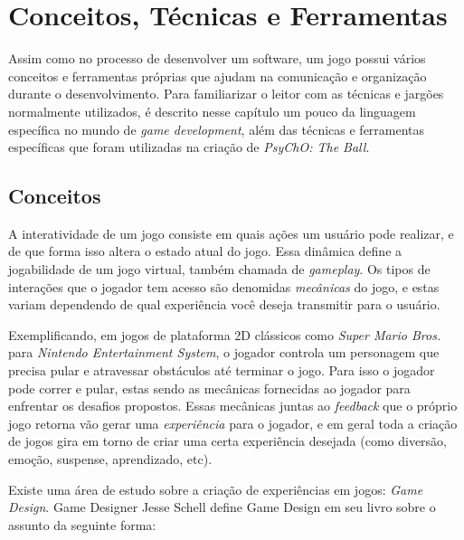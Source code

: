 
\chapter{Conceitos, Técnicas e Ferramentas}
\label{cap:conceitos_tecnicas_e_ferramentas}

Assim como no processo de desenvolver um software, um jogo possui vários conceitos e ferramentas próprias que ajudam na comunicação e organização durante o desenvolvimento.
Para familiarizar o leitor com as técnicas e jargões normalmente utilizados, é descrito nesse capítulo um pouco da linguagem específica no mundo de \textit{game development}, além das técnicas e ferramentas específicas que foram utilizadas na criação de \textit{PsyChO: The Ball}.

\section{Conceitos}
\label{sec:conceitos}
A interatividade de um jogo consiste em quais ações um usuário pode realizar, e de que forma isso altera o estado atual do jogo. Essa dinâmica define a jogabilidade de um jogo virtual, também chamada de \textit{gameplay}. Os tipos de interações que o jogador tem acesso são denomidas \textit{mecânicas} do jogo, e estas variam dependendo de qual experiência você deseja transmitir para o usuário.

Exemplificando, em jogos de plataforma 2D clássicos como \textit{Super Mario Bros.} para \textit{Nintendo Entertainment System}\cite{mario}, o jogador controla um personagem que precisa pular e atravessar obstáculos até terminar o jogo. Para isso o jogador pode correr e pular, estas sendo as mecânicas fornecidas ao jogador para enfrentar os desafios propostos. Essas mecânicas juntas ao \textit{feedback} que o próprio jogo retorna vão gerar uma \textit{experiência} para o jogador, e em geral toda a criação de jogos gira em torno de criar uma certa experiência desejada (como diversão, emoção, suspense, aprendizado, etc).

Existe uma área de estudo sobre a criação de experiências em jogos: \textit{Game Design}. Game Designer Jesse Schell define Game Design em seu livro sobre o assunto \cite{jessegamedesign} da seguinte forma:

